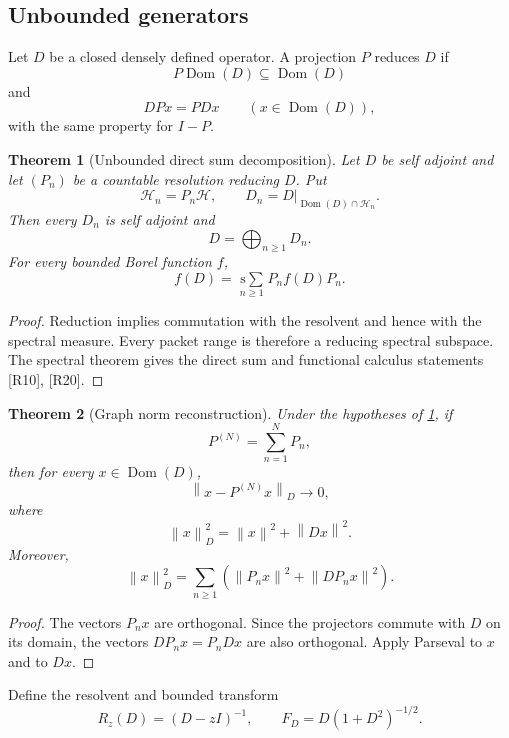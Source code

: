 \documentclass{aomart}
\newtheorem{theorem}{Theorem}[section]
\theoremstyle{definition}
\theoremstyle{remark}
\newcommand{\Hh}{\mathcal H}
\newcommand{\norm}[1]{\left\lVert#1\right\rVert}
\newcommand{\Rcite}[1]{\textup{[#1]}}
\begin{document}
\subsection{Unbounded generators}

\begin{definition}\label{def:unbounded_reduction}
Let \(D\) be a closed densely defined operator. A projection \(P\) reduces \(D\) if
\[
 P\operatorname{Dom}(D)\subseteq\operatorname{Dom}(D)
\]
and
\[
 DPx=PDx
 \qquad
 (x\in\operatorname{Dom}(D)),
\]
with the same property for \(I-P\).
\end{definition}

\begin{theorem}[Unbounded direct sum decomposition]\label{thm:unbounded_direct_sum}
Let \(D\) be self adjoint and let \((P_n)\) be a countable resolution reducing \(D\). Put
\[
 \Hh_n=P_n\Hh,
 \qquad
 D_n=D|_{\operatorname{Dom}(D)\cap\Hh_n}.
\]
Then every \(D_n\) is self adjoint and
\[
 \boxed{
 D=\bigoplus_{n\ge1}D_n.
 }
\]
For every bounded Borel function \(f\),
\[
 f(D)
 =
 \operatorname*{s\!\!\sum}_{n\ge1}
 P_nf(D)P_n.
\]
\end{theorem}

\begin{proof}
Reduction implies commutation with the resolvent and hence with the spectral measure. Every packet range is therefore a reducing spectral subspace. The spectral theorem gives the direct sum and functional calculus statements \Rcite{R10}, \Rcite{R20}.
\end{proof}

\begin{theorem}[Graph norm reconstruction]\label{thm:graph_norm}
Under the hypotheses of \cref{thm:unbounded_direct_sum}, if
\[
 P^{(N)}=\sum_{n=1}^{N}P_n,
\]
then for every \(x\in\operatorname{Dom}(D)\),
\[
 \norm{x-P^{(N)}x}_D\longrightarrow0,
\]
where
\[
 \norm{x}_D^2=\norm{x}^2+\norm{Dx}^2.
\]
Moreover,
\[
 \norm{x}_D^2
 =
 \sum_{n\ge1}
 \left(
 \norm{P_nx}^2+\norm{DP_nx}^2
 \right).
\]
\end{theorem}

\begin{proof}
The vectors \(P_nx\) are orthogonal. Since the projectors commute with \(D\) on its domain, the vectors \(DP_nx=P_nDx\) are also orthogonal. Apply Parseval to \(x\) and to \(Dx\).
\end{proof}

Define the resolvent and bounded transform
\[
 R_z(D)=(D-zI)^{-1},
 \qquad
 F_D=D(1+D^2)^{-1/2}.
\]
\end{document}
